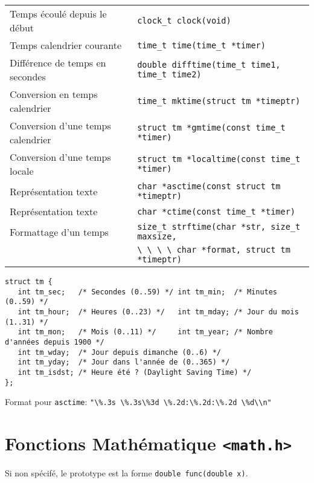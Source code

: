 \documentclass{article}
\newcommand{\cd}{\lstinline}
\begin{document}
\begin{multicols*}{3}
\begin{tabularx}{\linewidth}{Xl}
  Temps écoulé depuis le début & \cd{clock_t clock(void)} \\
  Temps calendrier courante & \cd{time_t time(time_t *timer)} \\
  Différence de temps en secondes & \cd{double difftime(time_t time1, time_t time2)} \\
  Conversion en temps calendrier & \cd{time_t mktime(struct tm *timeptr)} \\
  Conversion d'une temps calendrier & \cd{struct tm *gmtime(const time_t *timer)} \\
  Conversion d'une temps locale & \cd{struct tm *localtime(const time_t *timer)} \\
  Représentation texte & \cd{char *asctime(const struct tm *timeptr)} \\
  Représentation texte & \cd{char *ctime(const time_t *timer)} \\
  Formattage d'un temps & \cd{size_t strftime(char *str, size_t maxsize,} \\
                     & \cd{\ \ \ \ char *format, struct tm *timeptr)} \\
\end{tabularx}

\begin{lstlisting}
struct tm {
   int tm_sec;   /* Secondes (0..59) */ int tm_min;  /* Minutes (0..59) */
   int tm_hour;  /* Heures (0..23) */   int tm_mday; /* Jour du mois (1..31) */
   int tm_mon;   /* Mois (0..11) */     int tm_year; /* Nombre d'années depuis 1900 */
   int tm_wday;  /* Jour depuis dimanche (0..6) */
   int tm_yday;  /* Jour dans l'année de (0..365) */
   int tm_isdst; /* Heure été ? (Daylight Saving Time) */
};
\end{lstlisting}

Format pour \texttt{asctime}: \cd{"\%.3s \%.3s\%3d \%.2d:\%.2d:\%.2d \%d\\n"}


\section*{Fonctions Mathématique \texttt{<math.h>}}

Si non spécifé, le prototype est la forme \cd{double func(double x)}.


\end{multicols*}
\end{document}

